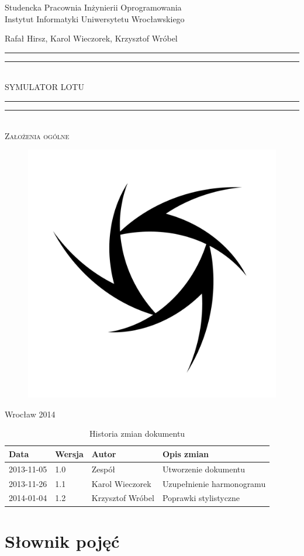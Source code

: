 \documentclass{mwrep}
\newcommand*{\titleGP}{\begingroup
\centering

{\large Studencka Pracownia Inżynierii Oprogramowania}\\Instytut Informatyki Uniwersytetu Wrocławskiego\par
\vspace*{16\baselineskip}

{\Large Rafał Hirsz, Karol Wieczorek, Krzysztof Wróbel\par}
\vspace*{\baselineskip}

\rule{\textwidth}{1.6pt}\vspace*{-\baselineskip}\vspace*{2pt}
\rule{\textwidth}{0.4pt}\\[\baselineskip]

{\Huge SYMULATOR LOTU}\\[0.2\baselineskip]

\rule{\textwidth}{0.4pt}\vspace*{-\baselineskip}\vspace{3.2pt}
\rule{\textwidth}{1.6pt}\\[\baselineskip]

\scshape
{\huge Założenia ogólne}\par
\vspace*{2\baselineskip}

\begin{figure}[h]
\centering
\includegraphics[width=5\baselineskip]{flightsim-team-logo.pdf}
\end{figure}
\vfill

{\large Wrocław 2014}\par

\pagebreak

\endgroup}
\begin{document}
\thispagestyle{empty}
\titleGP

\begin{center}
\begin{table}[h]
\begin{center}
\caption{Historia zmian dokumentu}\label{T:Zmiany}
\vspace{3ex}
\begin{tabularx}{1\textwidth}{|l|l|l|X|}
\hline
Data & Wersja & Autor & Opis zmian \\ \hline
2013-11-05 & 1.0 & Zespół & Utworzenie dokumentu \\
2013-11-26 & 1.1 & Karol Wieczorek & Uzupełnienie harmonogramu \\
2014-01-04 & 1.2 & Krzysztof Wróbel & Poprawki stylistyczne \\
\hline
\end{tabularx}
\end{center}
\end{table}
\end{center}

\pagebreak

\tableofcontents

\chapter{Słownik pojęć}
\end{document}
